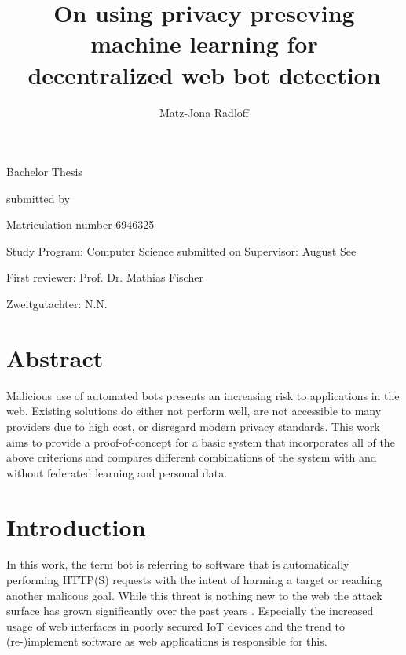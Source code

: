 \documentclass[
    fontsize=12pt,
    headings=small,
    parskip=half,           %
    bibliography=totoc,
    numbers=noenddot,       %
    open=any,               %
    final                   %
]{scrreprt}
\begin{document}
\title{On using privacy preseving machine learning for\\decentralized web bot detection}
\author{Matz-Jona Radloff}


\begin{titlepage}
\begin{center}\Large
	\vfill
    Bachelor Thesis
	\vfill
	\makeatletter
	{\Large\textsf{\textbf{\@title}}\par}
	\makeatother
	\vfill
    submitted by
	\par\bigskip
	\makeatletter
	{\@author} \par
	\makeatother
	Matriculation number 6946325 \par
	Study Program: Computer Science
	\vfill
	\makeatletter
	submitted on {\@date}
	\makeatother
	\vfill
	Supervisor: August See\par
	First reviewer: Prof. Dr. Mathias Fischer \par
	Zweitgutachter: N.N.
\end{center}
\end{titlepage}


\chapter*{Abstract}

Malicious use of automated bots presents an increasing risk to applications in the web. Existing solutions do either not perform well, are not accessible to many providers due to high cost, or disregard modern privacy standards. This work aims to provide a proof-of-concept for a basic system that incorporates all of the above criterions and compares different combinations of the system with and without federated learning and personal data.

\tableofcontents

\chapter{Introduction}

In this work, the term bot is referring to software that is automatically performing HTTP(S) requests with the intent of harming a target or reaching another malicous goal. While this threat is nothing new to the web the attack surface has grown significantly over the past years \cite{BAD_BOT_REPORT2020,BAD_BOT_REPORT2021}. Especially the increased usage of web interfaces in poorly secured IoT devices and the trend to (re-)implement software as web applications is responsible for this.
\end{document}
